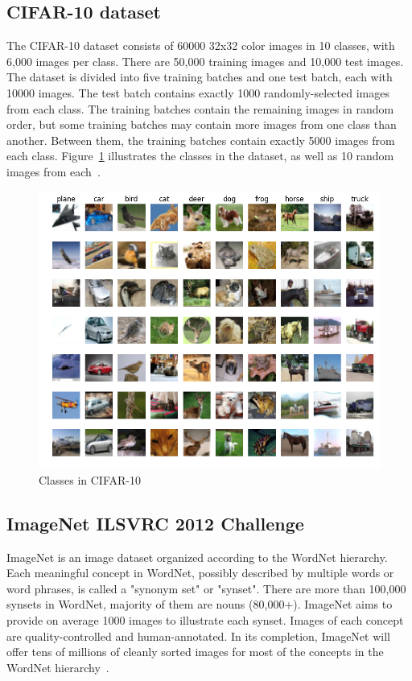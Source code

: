 \subsection{CIFAR-10 dataset}
The CIFAR-10 dataset consists of 60000 32x32 color images in 10 classes, with 
6,000 images per class. There are 50,000 training images and 10,000 test images.
The dataset is divided into five training batches and one test batch, each with 
10000 images. The test batch contains exactly 1000 randomly-selected images from 
each class. The training batches contain the remaining images in random order, 
but some training batches may contain more images from one class than another.  
Between them, the training batches contain exactly 5000 images from each class.
Figure~\ref{fig:cifar10} illustrates the classes in the dataset, as well as 10 
random images from each~\cite{cifar10}.
\begin{figure}[H]
    \centerline{\includegraphics[scale=0.40]{methodology/figs/cifar10.png}}
    \caption{Classes in CIFAR-10}
    \label{fig:cifar10}
\end{figure}

\subsection{ImageNet ILSVRC 2012 Challenge}
ImageNet is an image dataset organized according to the WordNet hierarchy. Each 
meaningful concept in WordNet, possibly described by multiple words or word 
phrases, is called a "synonym set" or "synset". There are more than 100,000 
synsets in WordNet, majority of them are nouns (80,000+). ImageNet aims to 
provide on average 1000 images to illustrate each synset. Images of each concept 
are quality-controlled and human-annotated. In its completion, ImageNet will 
offer tens of millions of cleanly sorted images for most of the concepts in the 
WordNet hierarchy~\cite{imagenet}.

